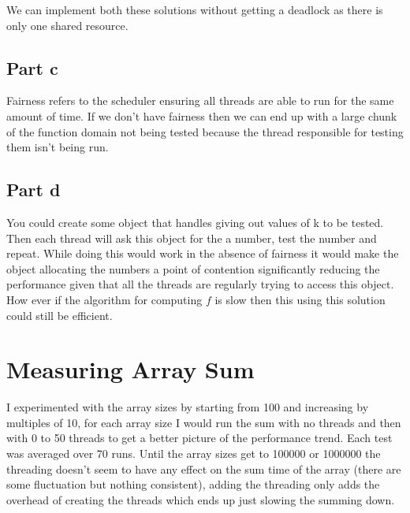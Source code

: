 \documentclass[a4paper, 12pt]{article}
\begin{document}
			We can implement both these solutions without getting a deadlock as there is only one shared resource.
			
		\subsection{Part c}
			Fairness refers to the scheduler ensuring all threads are able to run for the same amount of time. If we don't have fairness then we can end up with a large chunk of the function domain not being tested because the thread responsible for testing them isn't being run.
			
		\subsection{Part d}
			You could create some object that handles giving out values of k to be tested. Then each thread will ask this object for the a number, test the number and repeat. While doing this would work in the absence of fairness it would make the object allocating the numbers a point of contention significantly reducing the performance given that all the threads are regularly trying to access this object. How ever if the algorithm for computing $f$ is slow then this using this solution could still be efficient.
			
	\section{Measuring Array Sum}
		I experimented with the array sizes by starting from 100 and increasing by multiples of 10, for each array size I would run the sum with no threads and then with 0 to 50 threads to get a better picture of the performance trend. Each test was averaged over 70 runs. Until the array sizes get to 100000 or 1000000 the threading doesn't seem to have any effect on the sum time of the array (there are some fluctuation but nothing consistent), adding the threading only adds the overhead of creating the threads which ends up just slowing the summing down.
		
\end{document}
